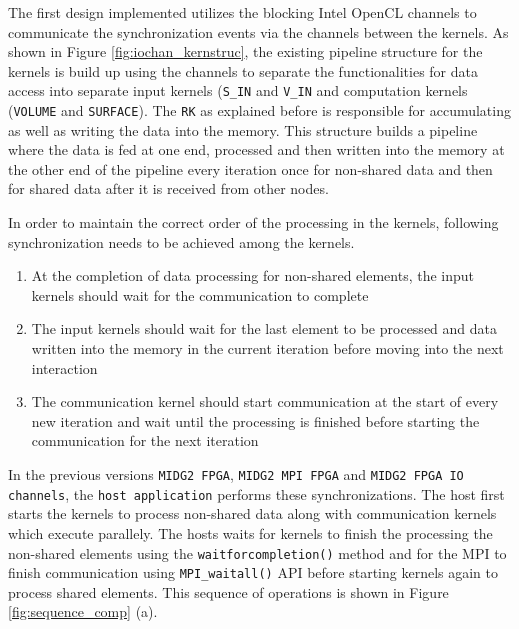 The first design implemented utilizes the blocking Intel OpenCL channels
to communicate the synchronization events via the channels between the kernels.
As shown in Figure \ref{fig:iochan_kernstruc}, the existing pipeline
structure for the kernels is build up using the channels to separate the functionalities
for data access into separate input kernels (\texttt{S\_IN} and \texttt{V\_IN}
and computation kernels (\texttt{VOLUME} and \texttt{SURFACE}). The \texttt{RK}
as explained before is responsible for accumulating as well as writing the data into
the memory. This structure builds a pipeline where the data is fed at one end,
processed and then written into the memory at the other end of the pipeline every
iteration once for non-shared data and then for shared data after it is received
from other nodes.

In order to maintain the correct order of the processing in the kernels,
following synchronization needs to be achieved among the kernels.

\begin{enumerate}
    \item At the completion of data processing for non-shared elements, the input kernels should wait
    for the communication to complete
    \item The input kernels should wait for the last element to be processed and data written into the memory
    in the current iteration before moving into the next interaction
    \item The communication kernel should start communication at the start of every new iteration and wait
    until the processing is finished before starting the communication for the next iteration
\end{enumerate}

In the previous versions \texttt{MIDG2 FPGA}, \texttt{MIDG2 MPI FPGA} and \texttt{MIDG2 FPGA IO channels},
the \texttt{host application} performs these synchronizations. The host first starts the kernels
to process non-shared data along with communication kernels which execute parallely. The hosts waits for
kernels to finish the processing the non-shared elements using the \texttt{waitforcompletion()} method and
for the MPI to finish communication using \texttt{MPI\_waitall()} API before starting
kernels again to process shared elements. This sequence of operations is shown in Figure
\ref{fig:sequence_comp} (a).

